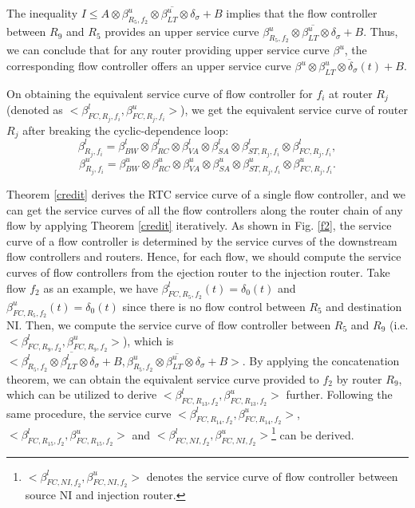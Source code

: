 \documentclass[preprint]{elsarticle}
\begin{document}
\begin{pf}
The inequality $I\leq A\otimes \overline{\beta_{R_5,f_2}^u\otimes\beta_{LT}^u\otimes\delta_\sigma+B}$ implies that the flow controller between $R_9$ and $R_5$ provides an upper service curve $\overline{\beta_{R_5,f_2}^u\otimes\beta_{LT}^u\otimes\delta_\sigma+B}$. Thus, we can conclude that for any router providing upper service curve $\beta^u$, the corresponding flow controller offers an upper service curve $\overline{\beta^u\otimes\beta_{LT}^u\otimes\delta_\sigma(t)+B}$.
\end{pf}

On obtaining the equivalent service curve of flow controller for $f_i$ at router $R_j$ (denoted as $<\beta_{FC,R_j,f_i}^l,\beta_{FC,R_j,f_i}^u>$), we get the equivalent service curve of router $R_j$ after breaking the cyclic-dependence loop:
$$\beta_{R_j,f_i}^l=\beta_{BW}^l\otimes\beta_{RC}^l\otimes\beta_{VA}^l\otimes\beta_{SA}^l\otimes\beta_{ST,R_j,f_i}^l\otimes\beta_{FC,R_j,f_i}^l,$$
$$\beta_{R_j,f_i}^u=\beta_{BW}^u\otimes\beta_{RC}^u\otimes\beta_{VA}^u\otimes\beta_{SA}^u\otimes\beta_{ST,R_j,f_i}^u\otimes\beta_{FC,R_j,f_i}^u.$$

Theorem \ref{credit} derives the RTC service curve of a single flow controller, and we can get the service curves of all the flow controllers along the router chain of any flow by applying Theorem \ref{credit} iteratively. As shown in Fig. \ref{f2}, the service curve of a flow controller is determined by the service curves of the downstream flow controllers and routers. Hence, for each flow, we should compute the service curves of flow controllers from the ejection router to the injection router. Take flow $f_2$ as an example, we have $\beta_{FC,R_5,f_2}^l(t)=\delta_0(t)$ and $\beta_{FC,R_5,f_2}^u(t)=\delta_0(t)$ since there is no flow control between $R_5$ and destination NI. Then, we compute the service curve of flow controller between $R_5$ and $R_{9}$ (i.e. $<\beta_{FC,R_9,f_2}^l,\beta_{FC,R_9,f_2}^u>$), which is $<\overline{\beta_{R_5,f_2}^l\otimes\beta_{LT}^l\otimes\delta_\sigma+B},\overline{\beta_{R_5,f_2}^u\otimes\beta_{LT}^u\otimes\delta_\sigma+B}>$. By applying the concatenation theorem, we can obtain the equivalent service curve provided to $f_2$ by router $R_{9}$, which can be utilized to derive $<\beta_{FC,R_{13},f_2}^l,\beta_{FC,R_{13},f_2}^u>$ further. Following the same procedure, the service curve $<\beta_{FC,R_{14},f_2}^l,\beta_{FC,R_{14},f_2}^u>$, $<\beta_{FC,R_{15},f_2}^l,\beta_{FC,R_{15},f_2}^u>$ and $<\beta_{FC,NI,f_2}^l,\beta_{FC,NI,f_2}^u>$\footnote{$<\beta_{FC,NI,f_2}^l,\beta_{FC,NI,f_2}^u>$ denotes the service curve of flow controller between source NI and injection router.} can be derived.
\end{document}
